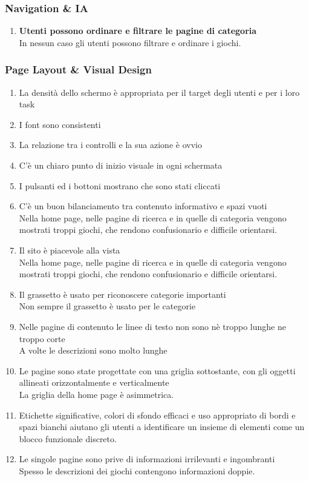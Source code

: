 \documentclass[../Report.tex]{subfiles}
\begin{document}
    \subsubsection{Navigation \& IA}
    \begin{enumerate}
        \item \textbf{Utenti possono ordinare e filtrare le pagine di categoria}\\In nessun caso gli utenti possono filtrare e ordinare i giochi.
    \end{enumerate}

    \subsubsection{Page Layout \& Visual Design}
    \begin{enumerate}
        \item La densità dello schermo è appropriata per il target degli utenti e per i loro task 
        \item I font sono consistenti 
        \item La relazione tra i controlli e la sua azione è ovvio 
        \item C’è un chiaro punto di inizio visuale in ogni schermata 
        \item I pulsanti ed i bottoni mostrano che sono stati cliccati 
        \item C’è un buon bilanciamento tra contenuto informativo e spazi vuoti \\
        Nella home page, nelle pagine di ricerca e in quelle di categoria vengono mostrati troppi giochi, che rendono confusionario e difficile orientarsi. 
        \item Il sito è piacevole alla vista\\
        Nella home page, nelle pagine di ricerca e in quelle di categoria vengono mostrati troppi giochi, che rendono confusionario e difficile orientarsi. 
        \item Il grassetto è usato per riconoscere categorie importanti\\
        Non sempre il grassetto è usato per le categorie 
        \item Nelle pagine di contenuto le linee di testo non sono nè troppo lunghe ne troppo corte\\
        A volte le descrizioni sono molto lunghe 
        \item Le pagine sono state progettate con una griglia sottostante, con gli oggetti allineati orizzontalmente e verticalmente\\
        La griglia della home page è asimmetrica.
        \item Etichette significative, colori di sfondo efficaci e uso appropriato di bordi e spazi bianchi aiutano gli utenti a identificare un insieme di elementi come un blocco funzionale discreto.\\
        \item Le singole pagine sono prive di informazioni irrilevanti e ingombranti \\
        Spesso le descrizioni dei giochi contengono informazioni doppie.
        
    \end{enumerate}
\end{document}

